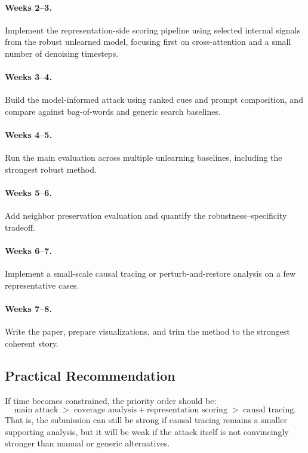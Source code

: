 \paragraph{Weeks 2--3.}
Implement the representation-side scoring pipeline using selected internal signals from the robust unlearned model, focusing first on cross-attention and a small number of denoising timesteps.

\paragraph{Weeks 3--4.}
Build the model-informed attack using ranked cues and prompt composition, and compare against bag-of-words and generic search baselines.

\paragraph{Weeks 4--5.}
Run the main evaluation across multiple unlearning baselines, including the strongest robust method.

\paragraph{Weeks 5--6.}
Add neighbor preservation evaluation and quantify the robustness--specificity tradeoff.

\paragraph{Weeks 6--7.}
Implement a small-scale causal tracing or perturb-and-restore analysis on a few representative cases.

\paragraph{Weeks 7--8.}
Write the paper, prepare visualizations, and trim the method to the strongest coherent story.

\subsection{Practical Recommendation}
\label{subsubsec:practical_recommendation}

If time becomes constrained, the priority order should be:
\begin{equation*}
\text{main attack} \;>\; \text{coverage analysis} + \text{representation scoring} \;>\; \text{causal tracing}.
\end{equation*}
That is, the submission can still be strong if causal tracing remains a smaller supporting analysis, but it will be weak if the attack itself is not convincingly stronger than manual or generic alternatives.